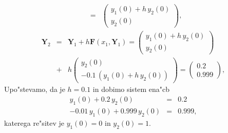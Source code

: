 \begin{enumerate}
\begin{eqnarray*}
    &=&
    \left(
    \begin{array}{r}
      y_1(0)+h\,y_2(0)\\
      y_2(0)
    \end{array}\right),
    \end{eqnarray*}
    \begin{eqnarray*}
      \mathbf{Y}_2&=&\mathbf{Y}_1+h\mathbf{F}(x_1,\mathbf{Y}_1)=
    \left(
    \begin{array}{r}
      y_1(0)+h\,y_2(0)\\
      y_2(0)
    \end{array}\right)\\
    &+&h
    \left(
    \begin{array}{r}
      y_2(0)\\
      -0.1\,(y_1(0)+h\,y_2(0))
    \end{array}\right)
    =
    \left(
    \begin{array}{r}
      0.2\\
      0.999
    \end{array}\right),
    \end{eqnarray*}
Upo"stevamo, da je $h=0.1$ in dobimo sistem ena"cb
\begin{eqnarray*}
   y_1(0)+0.2\,y_2(0)&=&0.2\\
   -0.01\,y_1(0)+0.999\,y_2(0)&=&0.999,
\end{eqnarray*}
katerega re"sitev je $y_1(0)=0$ in $y_2(0)=1$.
\end{enumerate}
 
